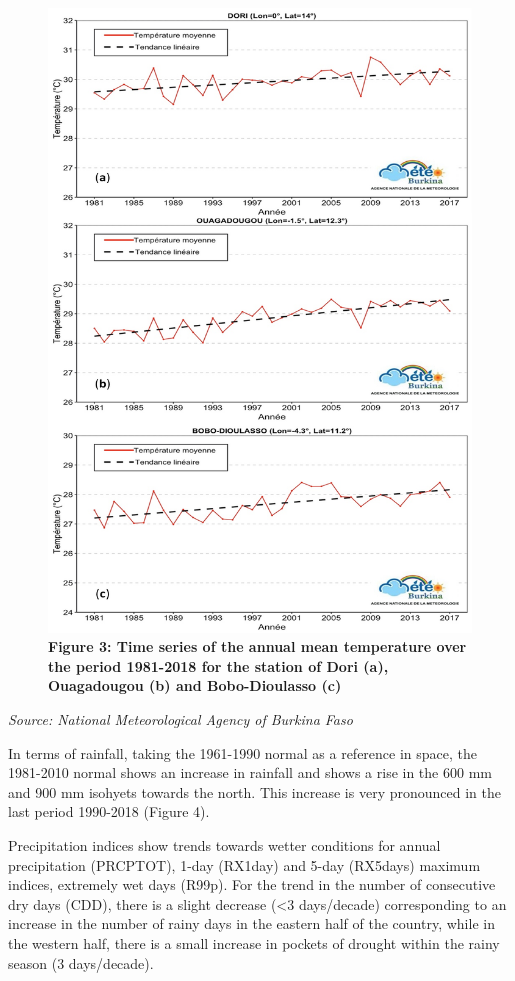 \documentclass[
]{book}
\begin{document}
\begin{figure}
\centering
\includegraphics{Figures and Photos/Figure 3.png}
\caption{\textbf{Figure 3: Time series of the annual mean temperature over the period 1981-2018 for the station of Dori (a), Ouagadougou (b) and Bobo-Dioulasso (c)}}
\end{figure}

\emph{Source: National Meteorological Agency of Burkina Faso}

In terms of rainfall, taking the 1961-1990 normal as a reference in space, the 1981-2010 normal shows an increase in rainfall and shows a rise in the 600 mm and 900 mm isohyets towards the north. This increase is very pronounced in the last period 1990-2018 (Figure 4).

Precipitation indices show trends towards wetter conditions for annual precipitation (PRCPTOT), 1-day (RX1day) and 5-day (RX5days) maximum indices, extremely wet days (R99p). For the trend in the number of consecutive dry days (CDD), there is a slight decrease (\textless3 days/decade) corresponding to an increase in the number of rainy days in the eastern half of the country, while in the western half, there is a small increase in pockets of drought within the rainy season (3 days/decade).
\end{document}
